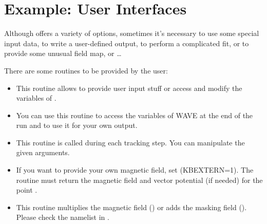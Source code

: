 \section{Example: User Interfaces} \label{ex77}

Although \W offers a variety of options, sometimes it's necessary to
use some special input data, to write a user-defined output, to perform
a complicated fit, or to provide some unusual field map, or {\ldots}

There are some routines to be provided by the user:

\begin{itemize}
\item {}

This routine allows to provide user input stuff or access and modify
the variables of \We.

\item {}

You can use this routine to access the variables of WAVE at the end of
the run and to use it for your own output.

\item {}

This routine is called during each tracking step. You can manipulate
the given arguments.

\item {}

If you want to provide your own magnetic field, set \scap(KBEXTERN=1).
The routine must return the magnetic field and vector potential (if
needed) for the point .

\item {}

This routine multiplies the magnetic field () or
adds the masking field (). Please check the namelist
 in \wie.

\end{itemize}


